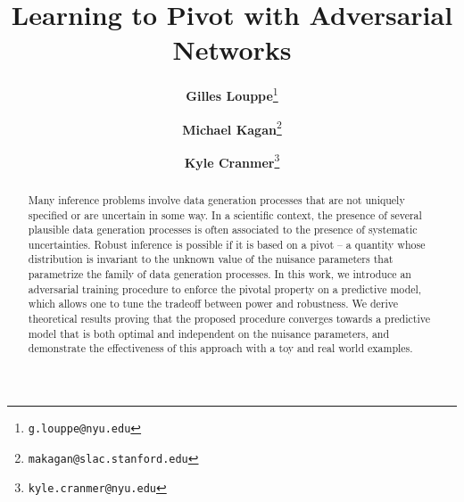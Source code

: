 \documentclass[twocolumn,superscriptaddress,aps]{revtex4-1}
\theoremstyle{plain}
\begin{document}

\title{\Large{Learning to Pivot with Adversarial Networks}}
\vspace{1cm}
\author{\small{\bf Gilles Louppe}\thanks{\texttt{g.louppe@nyu.edu}}}
\author{\small{\bf Michael Kagan}\thanks{\texttt{makagan@slac.stanford.edu}}}
\author{\small{\bf Kyle Cranmer}\thanks{\texttt{kyle.cranmer@nyu.edu}}}

\begin{abstract}

Many inference problems involve data generation processes that are not uniquely
specified or are uncertain in some way. In a scientific context, the presence of
several plausible data generation processes is often associated to the presence
of systematic uncertainties. Robust inference is possible if it is based on a
pivot -- a quantity whose distribution is invariant to the unknown value of the
nuisance parameters that parametrize the family of data generation processes. In
this work, we introduce an adversarial training procedure to enforce the pivotal
property on a predictive model, which allows one to tune the tradeoff between
power and robustness. We derive theoretical results proving that the proposed
procedure converges towards a predictive model that is both optimal and independent on
the nuisance parameters, and demonstrate the effectiveness of this approach with a
toy and real world examples.


\end{abstract}
\end{document}
